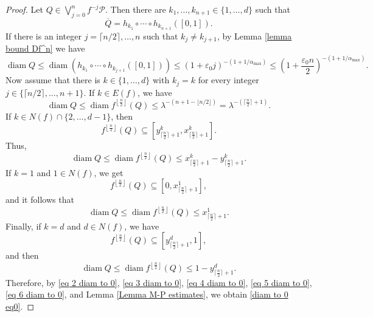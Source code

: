 \documentclass[10pt,a4paper]{amsart}
\numberwithin{equation}{section} %
\numberwithin{figure}{section} %
\renewcommand{\=}{\coloneqq}
\DeclareMathOperator{\diam}{diam}
\begin{document}
\begin{proof}
    Let $Q\in \bigvee_{j=0}^{n}f^{-j}\mathcal{P}$. Then there are $k_1,\ldots,k_{n+1} \in\{1,\ldots,d\}$ such that  
    \begin{equation}
    \overline{Q}=h_{k_1}\circ\cdots\circ h_{k_{n+1}}([0,1]).
    \end{equation}
    If there is an integer $j = \lceil n/2 \rceil,\dots, n$ such that $k_{j}\neq k_{j+1}$, by Lemma \ref{lemma bound Df^n} we have
    \begin{equation}\label{eq 2 diam to 0}
        \diam Q \leq \diam (h_{k_1}\circ \cdots \circ h_{k_{j+1}}([0,1])) \leq (1+\varepsilon_0 j)^{-(1+1/\alpha_{\max})} \leq \left(1+\frac{\varepsilon_0 n}{2}\right)^{-(1+1/\alpha_{\max})}.
    \end{equation}
    Now assume that there is $k\in\{1,\ldots,d\}$ with $k_j=k$ for every integer $j\in \{\lceil n/2 \rceil,\dots,n+1\}$. If $k\in E(f)$, we have
    \begin{equation}\label{eq 3 diam to 0}
        \diam Q \leq \diam f^{\left\lfloor \frac{n}{2}\right\rfloor}(Q)\leq \lambda^{-(n+1-\lfloor n/2\rfloor)}=\lambda^{-(\lceil \frac{n}{2}\rceil+1)}.
    \end{equation}
    If $k\in N(f)\cap\{2,\ldots,d-1\}$, then
    \begin{equation*}
        f^{\left\lfloor \frac{n}{2}\right\rfloor}(Q) \subseteq \left[y_{\lceil \frac{n}{2}\rceil+1}^k, x_{\lceil \frac{n}{2}\rceil+1}^k\right].
    \end{equation*}
    Thus,
    \begin{equation}\label{eq 4 diam to 0}
       \diam Q \leq \diam f^{\left\lfloor \frac{n}{2}\right\rfloor}(Q) \leq  x_{\lceil \frac{n}{2}\rceil+1}^k - y_{\lceil \frac{n}{2}\rceil+1}^k.
    \end{equation}
    If $k = 1$ and $1\in N(f)$, we get
    \begin{equation*}
        f^{\left\lfloor \frac{n}{2}\right\rfloor}(Q) \subseteq \left[0,x_{\lceil \frac{n}{2}\rceil+1}^1\right],
    \end{equation*}
    and it follows that
    \begin{equation}\label{eq 5 diam to 0}
        \diam Q \leq \diam f^{\left\lfloor \frac{n}{2}\right\rfloor}(Q) \leq x_{\lceil \frac{n}{2}\rceil+1}^1.
    \end{equation}
    Finally, if $k = d $ and $d\in N(f)$, we have
    \begin{equation*}
        f^{\left\lfloor \frac{n}{2}\right\rfloor}(Q) \subseteq \left[y_{\lceil \frac{n}{2}\rceil+1}^d,1\right],
    \end{equation*}
    and then 
    \begin{equation}\label{eq 6 diam to 0}
        \diam Q \leq \diam f^{\left\lfloor \frac{n}{2}\right\rfloor}(Q) \leq 1-y_{\lceil \frac{n}{2}\rceil+1}^d.
    \end{equation}
    Therefore, by  \eqref{eq 2 diam to 0}, \eqref{eq 3 diam to 0}, \eqref{eq 4 diam to 0}, \eqref{eq 5 diam to 0}, \eqref{eq 6 diam to 0}, and Lemma \ref{Lemma M-P estimates}, we obtain \eqref{diam to 0 eq0}.
    \end{proof}
\end{document}

